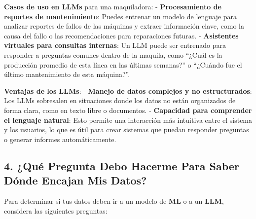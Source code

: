 \documentclass[
  10pt,
  letterpaper,
]{book}
\begin{document}
\textbf{Casos de uso en LLMs} para una maquiladora: -
\textbf{Procesamiento de reportes de mantenimiento}: Puedes entrenar un
modelo de lenguaje para analizar reportes de fallos de las máquinas y
extraer información clave, como la causa del fallo o las recomendaciones
para reparaciones futuras. - \textbf{Asistentes virtuales para consultas
internas}: Un LLM puede ser entrenado para responder a preguntas comunes
dentro de la maquila, como ``¿Cuál es la producción promedio de esta
línea en las últimas semanas?'' o ``¿Cuándo fue el último mantenimiento
de esta máquina?''.

\textbf{Ventajas de los LLMs}: - \textbf{Manejo de datos complejos y no
estructurados}: Los LLMs sobresalen en situaciones donde los datos no
están organizados de forma clara, como en texto libre o documentos. -
\textbf{Capacidad para comprender el lenguaje natural}: Esto permite una
interacción más intuitiva entre el sistema y los usuarios, lo que es
útil para crear sistemas que puedan responder preguntas o generar
informes automáticamente.

\subsection{\texorpdfstring{4. \textbf{¿Qué Pregunta Debo Hacerme Para
Saber Dónde Encajan Mis
Datos?}}{4. ¿Qué Pregunta Debo Hacerme Para Saber Dónde Encajan Mis Datos?}}\label{quuxe9-pregunta-debo-hacerme-para-saber-duxf3nde-encajan-mis-datos}

Para determinar si tus datos deben ir a un modelo de \textbf{ML} o a un
\textbf{LLM}, considera las siguientes preguntas:
\end{document}
